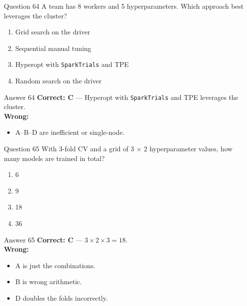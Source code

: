 \documentclass[aspectratio=169,11pt]{beamer}
\begin{document}
	\begin{frame}{Question 64}
		A team has 8 workers and 5 hyperparameters. Which approach best leverages the cluster?
		\begin{enumerate}[label=\Alph*.]
			\item Grid search on the driver
			\item Sequential manual tuning
			\item Hyperopt with \texttt{SparkTrials} and TPE
			\item Random search on the driver
		\end{enumerate}
	\end{frame}
	\begin{frame}{Answer 64}
		\textbf{Correct: C} --- Hyperopt with \texttt{SparkTrials} and TPE leverages the cluster.\\
		\vspace{0.5em}
		\textbf{Wrong:}
		\begin{itemize}
			\item A--B--D are inefficient or single-node.
		\end{itemize}
	\end{frame}
	
	\begin{frame}{Question 65}
		With 3-fold CV and a grid of 3 $\times$ 2 hyperparameter values, how many models are trained in total?
		\begin{enumerate}[label=\Alph*.]
			\item 6
			\item 9
			\item 18
			\item 36
		\end{enumerate}
	\end{frame}
	\begin{frame}{Answer 65}
		\textbf{Correct: C} --- $3 \times 2 \times 3 = 18$.\\
		\vspace{0.5em}
		\textbf{Wrong:}
		\begin{itemize}
			\item A is just the combinations.
			\item B is wrong arithmetic.
			\item D doubles the folds incorrectly.
		\end{itemize}
	\end{frame}
	
\end{document}
